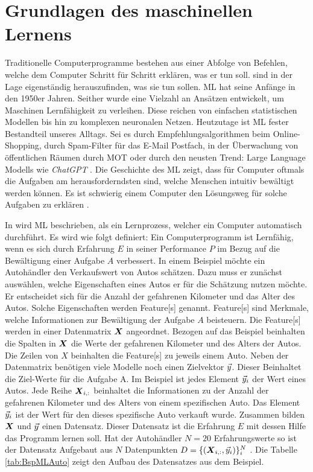 \section{Grundlagen des maschinellen Lernens}
Traditionelle Computerprogramme bestehen aus einer Abfolge von Befehlen, welche dem Computer Schritt für Schritt erklären, was er tun soll.  sind in der Lage eigenständig herauszufinden, was sie tun sollen. \Gls{ML} hat seine Anfänge in den 1950er Jahren. Seither wurde eine Vielzahl an Ansätzen entwickelt, um Maschinen Lernfähigkeit zu verleihen. Diese reichen von einfachen statistischen Modellen bis hin zu komplexen neuronalen Netzen. Heutzutage ist \gls{ML} fester Bestandteil unseres Alltags. Sei es durch Empfehlungsalgorithmen beim Online-Shopping, durch Spam-Filter für das E-Mail Postfach, in der Überwachung von öffentlichen Räumen durch \gls{MOT} oder durch den neusten Trend: Large Language Modells wie \textit{ChatGPT} \cite{Domingos.2015, Liu.2023}. Die Geschichte des \gls{ML} zeigt, dass für Computer oftmals die Aufgaben am herausforderndsten sind, welche Menschen intuitiv bewältigt werden können. Es ist schwierig einem Computer den Lösungsweg für solche Aufgaben zu erklären \cite{Goodfellow.2016}. \par

In \cite{Mitchell.1997} wird \gls{ML} beschrieben, als ein Lernprozess, welcher ein Computer automatisch durchführt. Es wird wie folgt definiert: Ein Computerprogramm ist Lernfähig, wenn es sich durch Erfahrung \(E\) in seiner Performance \(P\) im Bezug auf die Bewältigung einer Aufgabe \(A\) verbessert. In einem Beispiel möchte ein Autohändler den Verkaufswert von Autos schätzen. Dazu muss er zunächst auswählen, welche Eigenschaften eines Autos er für die Schätzung nutzen möchte. Er entscheidet sich für die Anzahl der gefahrenen Kilometer und das Alter des Autos. Solche Eigenschaften werden \gls{Feature}[s] genannt. \gls{Feature}[s] sind Merkmale, welche Informationen zur Bewältigung der Aufgabe \(A\) beisteuern. Die \gls{Feature}[s] werden in einer \gls{Datenmatrix} \(\boldsymbol{X}\) angeordnet. Bezogen auf das Beispiel beinhalten die Spalten in \(\boldsymbol{X}\) die Werte der gefahrenen Kilometer und des Alters der Autos. Die Zeilen von \(X\) beinhalten die \gls{Feature}[s] zu jeweils einem Auto. Neben der \gls{Datenmatrix} benötigen viele Modelle noch einen \gls{Zielvektor} \(\vec{y}\). Dieser Beinhaltet die Ziel-Werte für die Aufgabe A. Im Beispiel ist jedes Element \(\vec{y}_i\) der Wert eines Autos. Jede Reihe \(\boldsymbol{X}_{i,:}\) beinhaltet die Informationen zu der Anzahl der gefahrenen Kilometer und des Alters von einem spezifischen Auto. Das Element \(\vec{y}_i\) ist der Wert für den dieses spezifische Auto verkauft wurde. Zusammen bilden \(\boldsymbol{X}\) und \(\vec{y}\) einen Datensatz. Dieser Datensatz ist die Erfahrung \(E\) mit dessen Hilfe das Programm lernen soll. Hat der Autohändler \(N=20\) Erfahrungswerte so ist der Datensatz Aufgebaut aus \(N\) Datenpunkten \(D = \{(\boldsymbol{X}_{i,:}, \vec{y}_i)\}_{i}^{N}\) \cite{Goodfellow.2016, Burkov.2019, ShalevShwartz.2014}. Die Tabelle \ref{tab:BspMLAuto} zeigt den Aufbau des Datensatzes aus dem Beispiel. 


